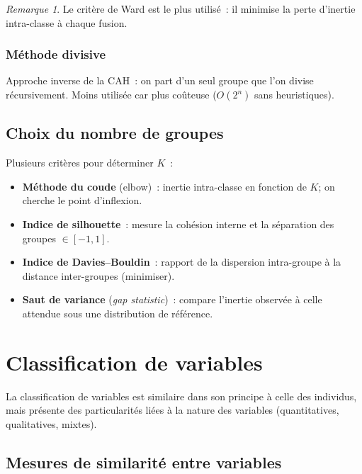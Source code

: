 \documentclass[a4paper,11pt]{article}
\theoremstyle{definition}
\theoremstyle{remark}
\newtheorem*{remark}{Remarque}
\begin{document}
\begin{remark}
  Le crit\`ere de Ward est le plus utilis\'e~: il minimise la
  perte d'inertie intra-classe \`a chaque fusion.
\end{remark}

\subsubsection{M\'ethode divisive}

Approche inverse de la CAH~: on part d'un seul groupe que l'on
divise r\'ecursivement. Moins utilis\'ee car plus co\^uteuse
($O(2^n)$ sans heuristiques).

\subsection{Choix du nombre de groupes}

Plusieurs crit\`eres pour d\'eterminer $K$~:
\begin{itemize}
  \item \textbf{M\'ethode du coude} (elbow)~: inertie intra-classe
    en fonction de $K$; on cherche le point d'inflexion.
  \item \textbf{Indice de silhouette}~: mesure la coh\'esion interne
    et la s\'eparation des groupes $\in [-1, 1]$.
  \item \textbf{Indice de Davies--Bouldin}~: rapport de la dispersion
    intra-groupe \`a la distance inter-groupes (minimiser).
  \item \textbf{Saut de variance} (\emph{gap statistic})~: compare
    l'inertie observ\'ee \`a celle attendue sous une distribution
    de r\'ef\'erence.
\end{itemize}

\section{Classification de variables}

La classification de variables est similaire dans son principe \`a
celle des individus, mais pr\'esente des particularit\'es li\'ees \`a
la nature des variables (quantitatives, qualitatives, mixtes).

\subsection{Mesures de similarit\'e entre variables}
\end{document}
